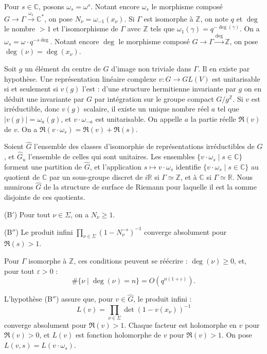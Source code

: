 \documentclass[12pt,a4paper]{article}
\theoremstyle{plain}
\theoremstyle{definition}
\theoremstyle{remark}
\newcommand{\CC}{{\mathbb{C}}}
\newcommand{\RR}{{\mathbb{R}}}
\newcommand{\ZZ}{{\mathbb{Z}}}
\begin{document}
Pour $s \in \CC$, posons $\omega_s = \omega^s$. Notant encore $\omega_s$ le morphisme compos\'e $G \to \Gamma \xrightarrow{\omega_s} \CC^*$, on pose $N_\nu = \omega_{-1}(x_\nu)$. Si $\Gamma$ est isomorphe \`a $\ZZ$, on note $q$ et $\deg$ le nombre $> 1$ et l'isomorphisme de $\Gamma$ avec $\ZZ$ tels que $\omega_1(\gamma) = q^{-\deg(\gamma)}$. On a $\omega_s = \omega \cdot q^{-s \deg}$. Notant encore $\deg$ le morphisme compos\'e $G \to \Gamma \xrightarrow{\deg} \ZZ$, on pose $\deg(\nu) = \deg(x_\nu)$.

Soit $g$ un \'el\'ement du centre de $G$ d'image non triviale dans $\Gamma$. Il en existe par hypoth\`ese. Une repr\'esentation lin\'eaire complexe $v : G \to GL(V)$ est unitarisable si et seulement si $v(g)$ l'est : d'une structure hermitienne invariante par $g$ on en d\'eduit une invariante par $G$ par int\'egration sur le groupe compact $G/g^\ZZ$. Si $v$ est irr\'eductible, donc $v(g)$ scalaire, il existe un unique nombre r\'eel $a$ tel que $|v(g)| = \omega_a(g)$, et $v \cdot \omega_{-a}$ est unitarisable. On appelle $a$ la partie r\'eelle $\Re(v)$ de $v$. On a $\Re(v \cdot \omega_s) = \Re(v) + \Re(s)$.

Soient $\widehat{G}$ l'ensemble des classes d'isomorphie de repr\'esentations irr\'eductibles de $G$, et $\widehat{G}_u$ l'ensemble de celles qui sont unitaires. Les ensembles $\{v \cdot \omega_s \mid s \in \CC\}$ forment une partition de $\widehat{G}$, et l'application $s \mapsto v \cdot \omega_s$ identifie $\{v \cdot \omega_s \mid s \in \CC\}$ au quotient de $\CC$ par un sous-groupe discret de $i\RR$ si $\Gamma \simeq \ZZ$, et \`a $\CC$ si $\Gamma \simeq \RR$. Nous munirons $\widehat{G}$ de la structure de surface de Riemann pour laquelle il est la somme disjointe de ces quotients.


(B$'$) Pour tout $\nu \in \Sigma$, on a $N_\nu \geq 1$.

(B$''$) Le produit infini $\prod_{\nu \in \Sigma} (1 - N_\nu^{-s})^{-1}$ converge absolument pour $\Re(s) > 1$.

Pour $\Gamma$ isomorphe \`a $\ZZ$, ces conditions peuvent se r\'e\'ecrire : $\deg(\nu) \geq 0$, et, pour tout $\varepsilon > 0$ :
\[ \#\{\nu \mid \deg(\nu) = n\} = O(q^{n(1+\varepsilon)}). \]

L'hypoth\`ese (B$''$) assure que, pour $v \in \widehat{G}$, le produit infini :
\[ L(v) = \prod_{\nu \in \Sigma} \det(1 - v(x_\nu))^{-1} \]
converge absolument pour $\Re(v) > 1$. Chaque facteur est holomorphe en $v$ pour $\Re(v) > 0$, et $L(v)$ est fonction holomorphe de $v$ pour $\Re(v) > 1$. On pose $L(v, s) = L(v \cdot \omega_s)$.
\end{document}
